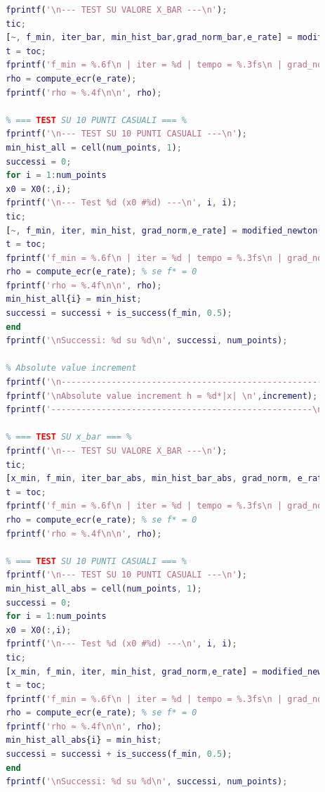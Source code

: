\documentclass[a4paper,12pt]{article}
\begin{document}
\begin{lstlisting}[language=Matlab,caption={Full script: Modified Newton method on Generalyzed Broyden},label={lst:broyden}]
		% === TEST SU x_bar === %
		fprintf('\n--- TEST SU VALORE X_BAR ---\n');
		tic;
		[~, f_min, iter_bar, min_hist_bar,grad_norm_bar,e_rate] = modified_newton(generalized_broyden,grad_f,hess_f,x_bar,tol,max_iter,fd,increment,0);
		t = toc;
		fprintf('f_min = %.6f\n | iter = %d | tempo = %.3fs\n | grad_norm = %.6f\n', f_min, iter_bar, t,grad_norm_bar);
		rho = compute_ecr(e_rate); 
		fprintf('rho ≈ %.4f\n\n', rho);
		
		% === TEST SU 10 PUNTI CASUALI === %
		fprintf('\n--- TEST SU 10 PUNTI CASUALI ---\n');
		min_hist_all = cell(num_points, 1);
		successi = 0;
		for i = 1:num_points
		x0 = X0(:,i);
		fprintf('\n--- Test %d (x0 #%d) ---\n', i, i);
		tic;
		[~, f_min, iter, min_hist, grad_norm,e_rate] = modified_newton(generalized_broyden,grad_f,hess_f,x0,tol,max_iter,fd,increment,0);
		t = toc;
		fprintf('f_min = %.6f\n | iter = %d | tempo = %.3fs\n | grad_norm = %.6f\n', f_min, iter, t,grad_norm);
		rho = compute_ecr(e_rate); % se f* = 0
		fprintf('rho ≈ %.4f\n\n', rho);
		min_hist_all{i} = min_hist;
		successi = successi + is_success(f_min, 0.5);
		end
		fprintf('\nSuccessi: %d su %d\n', successi, num_points);
		
		% Absolute value increment
		fprintf('\n----------------------------------------------------');
		fprintf('\nAbsolute value increment h = %d*|x| \n',increment);
		fprintf('----------------------------------------------------\n');
		
		% === TEST SU x_bar === %
		fprintf('\n--- TEST SU VALORE X_BAR ---\n');
		tic;
		[x_min, f_min, iter_bar_abs, min_hist_bar_abs, grad_norm, e_rate] = modified_newton(generalized_broyden,grad_f,hess_f,x_bar,tol,max_iter,fd,increment,1);
		t = toc;
		fprintf('f_min = %.6f\n | iter = %d | tempo = %.3fs\n | grad_norm = %.6f\n', f_min, iter_bar_abs, t,grad_norm);
		rho = compute_ecr(e_rate); % se f* = 0
		fprintf('rho ≈ %.4f\n\n', rho);
		
		% === TEST SU 10 PUNTI CASUALI === %
		fprintf('\n--- TEST SU 10 PUNTI CASUALI ---\n');
		min_hist_all_abs = cell(num_points, 1);
		successi = 0;
		for i = 1:num_points
		x0 = X0(:,i);
		fprintf('\n--- Test %d (x0 #%d) ---\n', i, i);
		tic;
		[x_min, f_min, iter, min_hist, grad_norm,e_rate] = modified_newton(generalized_broyden,grad_f,hess_f,x0,tol,max_iter,fd,increment,1);
		t = toc;
		fprintf('f_min = %.6f\n | iter = %d | tempo = %.3fs\n | grad_norm = %.6f\n', f_min, iter, t,grad_norm);
		rho = compute_ecr(e_rate); % se f* = 0
		fprintf('rho ≈ %.4f\n\n', rho);
		min_hist_all_abs{i} = min_hist;
		successi = successi + is_success(f_min, 0.5);
		end   
		fprintf('\nSuccessi: %d su %d\n', successi, num_points);
		

\end{lstlisting}
\end{document}
